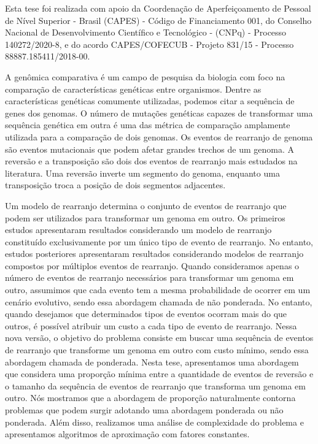 \documentclass[Portugues]{ic-tese-v3}
\theoremstyle{definition}
\theoremstyle{remark}
\theoremstyle{definition}
\begin{document}
Esta tese foi realizada com apoio da Coordenação de Aperfeiçoamento de Pessoal de Nível Superior - Brasil (CAPES) - Código de Financiamento 001, do Conselho Nacional de Desenvolvimento Científico e Tecnológico - (CNPq) - Processo 140272/2020-8, e do acordo CAPES/COFECUB - Projeto 831/15 - Processo 88887.185411/2018-00.

\begin{resumo}
A genômica comparativa é um campo de pesquisa da biologia com foco na comparação de características genéticas entre organismos. Dentre as características genéticas comumente utilizadas, podemos citar a sequência de genes dos genomas. O número de mutações genéticas capazes de transformar uma sequência genética em outra é uma das métrica de comparação amplamente utilizada para a comparação de dois genomas. Os eventos de rearranjo de genoma são eventos mutacionais que podem afetar grandes trechos de um genoma. A reversão e a transposição são dois dos eventos de rearranjo mais estudados na literatura. Uma reversão inverte um segmento do genoma, enquanto uma transposição troca a posição de dois segmentos adjacentes.

Um modelo de rearranjo determina o conjunto de eventos de rearranjo que podem ser utilizados para transformar um genoma em outro. Os primeiros estudos apresentaram resultados considerando um modelo de rearranjo constituído exclusivamente por um único tipo de evento de rearranjo. No entanto, estudos posteriores apresentaram resultados considerando modelos de rearranjo compostos por múltiplos eventos de rearranjo. Quando consideramos apenas o número de eventos de rearranjo necessários para transformar um genoma em outro, assumimos que cada evento tem a mesma probabilidade de ocorrer em um cenário evolutivo, sendo essa abordagem chamada de não ponderada. No entanto, quando desejamos que determinados tipos de eventos ocorram mais do que outros, é possível atribuir um custo a cada tipo de evento de rearranjo. Nessa nova versão, o objetivo do problema consiste em buscar uma sequência de eventos de rearranjo que transforme um genoma em outro com custo mínimo, sendo essa abordagem chamada de ponderada. Nesta tese, apresentamos uma abordagem que considera uma proporção mínima entre a quantidade de eventos de reversão e o tamanho da sequência de eventos de rearranjo que transforma um genoma em outro. Nós mostramos que a abordagem de proporção naturalmente contorna problemas que podem surgir adotando uma abordagem ponderada ou não ponderada. Além disso, realizamos uma análise de complexidade do problema e apresentamos algoritmos de aproximação com fatores constantes.


\end{resumo}
\end{document}
